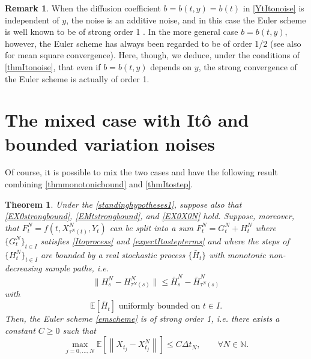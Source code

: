 \documentclass[reqno,12pt]{amsart}
\theoremstyle{plain} %
\newtheorem{theorem}{Theorem}[section]
\theoremstyle{definition} %
\newtheorem{remark}{Remark}[section]
\begin{document}
\begin{remark}
    When the diffusion coefficient $b = b(t, y) = b(t)$ in \eqref{YtItonoise} is independent of $y$, the noise is an additive noise, and in this case the Euler scheme is well known to be of strong order 1 \cite[Section 19.3.1]{HighamKloeden2021}. In the more general case $b=b(t, y)$, however, the Euler scheme has always been regarded to be of order 1/2 \cite{GruneKloeden2001} (see also \cite{WangCaoHanKloeden2021} for mean square convergence). Here, though, we deduce, under the conditions of \cref{thmItonoise}, that even if $b=b(t, y)$ depends on $y$, the strong convergence of the Euler scheme is actually of order 1.    
\end{remark}

\section{The mixed case with It\^o and bounded variation noises}
\label{secmixed}

Of course, it is possible to mix the two cases and have the following result combining \cref{thmmonotonicbound} and \cref{thmItostep}.

\begin{theorem}
    \label{thmmixedcase}
    Under the \cref{standinghypotheses1}, suppose also that
    \eqref{EX0strongbound}, \eqref{EMtstrongbound}, and \eqref{EX0X0N} hold. Suppose, moreover, that $F_t^N = f(t, X_{\tau^N(t)}^N, Y_t)$ can be split into a sum $F_t^N = G_t^N + H_t^N$ where $\{G_t^N\}_{t\in I}$ satisfies \eqref{Itoprocess} and \eqref{expectItostepterms} and where the steps of $\{H_t^N\}_{t\in I}$ are bounded by a real stochastic process $\{\bar H_t\}$ with monotonic non-decreasing sample paths, i.e.
    \begin{equation}
        \label{stepHbound}
        \|H_s^N - H_{\tau^N(s)}^N\| \leq \bar H_s^N - \bar H_{\tau^N(s)}^N
    \end{equation}
    with
    \begin{equation}
      \label{expectstepHmonotonic}
      \mathbb{E}[\bar H_t] \textrm{ uniformly bounded on } t\in I.
    \end{equation}
    Then, the Euler scheme \eqref{emscheme} is of strong order 1, i.e. there exists a constant $C\geq 0$ such that
    \begin{equation}
      \label{thmmixedtrongordernew}
        \max_{j=0, \ldots, N}\mathbb{E}\left[ \left\| X_{t_j} - X_{t_j}^N \right\| \right] \leq C \Delta t_N, \qquad \forall N \in \mathbb{N}.
    \end{equation}
\end{theorem}
\end{document}
